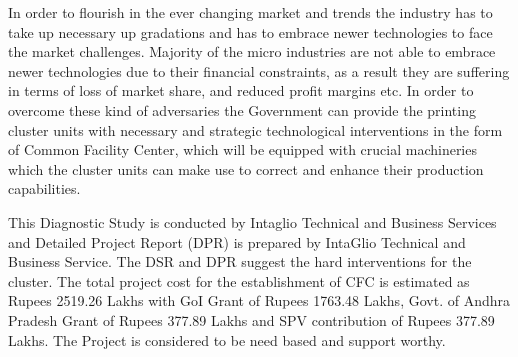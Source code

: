 In order to flourish in the ever changing market and trends the industry has to
take up necessary up gradations and has to embrace newer technologies to face
the market challenges. Majority of the micro industries are not able to embrace
newer technologies due to their financial constraints, as a result they are
suffering in terms of loss of market share, and reduced profit margins etc. In
order to overcome these kind of adversaries the Government can provide the
printing cluster units with necessary and strategic technological interventions in the form of Common Facility Center, which will be equipped with crucial
machineries which the cluster units can make use to correct and enhance their
production capabilities.

This Diagnostic Study is conducted by Intaglio Technical and Business
Services and Detailed Project Report (DPR) is prepared by IntaGlio Technical
and Business Service. The DSR and DPR suggest the hard interventions for the
cluster. The total project cost for the establishment of CFC is estimated as
Rupees 2519.26 Lakhs with GoI Grant of Rupees 1763.48 Lakhs, Govt. of
Andhra Pradesh Grant of Rupees 377.89 Lakhs and SPV contribution of Rupees
377.89 Lakhs. The Project is considered to be need based and support worthy.